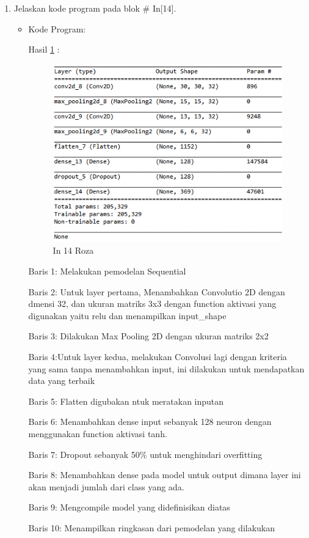 \begin{enumerate}
\item Jelaskan kode program pada blok \# In[14].
\begin{itemize}
\item Kode Program:

\par Hasil \ref{in14roza} :
\begin{figure}[!hbtp]
\centering
\includegraphics[scale=0.7]{figures/prak14roza.png}
\caption{In 14 Roza}
\label{in14roza}
\end{figure}
\par Baris 1: Melakukan pemodelan Sequential
\par Baris 2: Untuk layer pertama, Menambahkan Convolutio 2D dengan dmensi 32, dan ukuran matriks 3x3 dengan function aktivasi yang digunakan yaitu relu dan menampilkan input\_shape
\par Baris 3: Dilakukan Max Pooling 2D dengan ukuran matriks 2x2
\par Baris 4:Untuk layer kedua, melakukan Convolusi lagi dengan kriteria yang sama tanpa menambahkan input, ini dilakukan untuk mendapatkan data yang terbaik
\par Baris 5:  Flatten digubakan ntuk meratakan inputan
\par Baris 6: Menambahkan dense input sebanyak 128 neuron dengan menggunakan function aktivasi tanh.
\par Baris 7: Dropout sebanyak 50\% untuk menghindari overfitting
\par Baris 8: Menambahkan dense pada model untuk output dimana layer ini akan menjadi jumlah dari class yang ada.
\par Baris 9: Mengcompile model yang didefinisikan diatas
\par Baris 10: Menampilkan ringkasan dari pemodelan yang dilakukan
\end{itemize}
\par


\end{enumerate}
